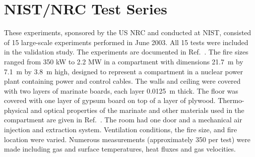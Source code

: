 \section{NIST/NRC Test Series}

These experiments, sponsored by the US NRC and conducted at NIST, consisted of 15 large-scale experiments performed in June 2003. All 15 tests were
included in the validation study. The experiments are documented in Ref.~\cite{Hamins:SP1013-1}. The fire sizes ranged from 350 kW to 2.2 MW in a compartment with dimensions
21.7~m by 7.1~m by 3.8~m high, designed to represent a compartment in a nuclear power plant containing power and control cables.
The walls and ceiling were covered with two layers of marinate boards, each layer 0.0125~m thick. The floor
was covered with one layer of gypsum board on top of a layer of plywood. Thermo-physical and optical properties of the marinate
and other materials used in the compartment are given in Ref.~\cite{Hamins:SP1013-1}. The room had one door and a mechanical air injection and extraction
system. Ventilation conditions, the fire size, and fire location were varied. Numerous measurements (approximately 350 per test) were made including
gas and surface temperatures, heat fluxes and gas velocities.

